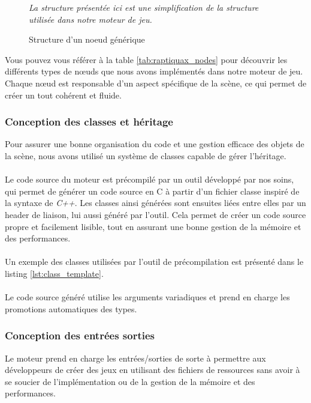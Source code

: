     \begin{figure}[h]
        \centering
        
        \emph{La structure présentée ici est une simplification de la structure utilisée dans notre moteur de jeu.}
        \caption{Structure d'un noeud générique}
        \label{fig:node_structure}
    \end{figure}

    Vous pouvez vous référer à la table \ref{tab:raptiquax_nodes} pour découvrir
    les différents types de n\oe{}uds que nous avons implémentés dans notre
    moteur de jeu. Chaque n\oe{}ud est responsable d'un aspect spécifique de
    la scène, ce qui permet de créer un tout cohérent et fluide.


\subsubsection{Conception des classes et héritage}

    Pour assurer une bonne organisation du code et une gestion efficace
    des objets de la scène, nous avons utilisé un système de classes capable
    de gérer l'héritage.
    \\ \\
    Le code source du moteur est précompilé par un outil développé par nos
    soins, qui permet de générer un code source en C à partir d'un fichier
    classe inspiré de la syntaxe de \emph{C++}. Les classes ainsi générées
    sont ensuites liées entre elles par un header de liaison, lui aussi
    généré par l'outil. Cela permet de créer un code source propre et
    facilement lisible, tout en assurant une bonne gestion de la mémoire et des
    performances.
    \\ \\
    Un exemple des classes utilisées par l'outil de précompilation est
    présenté dans le listing \ref{lst:class_template}.
    \\ \\
    Le code source généré utilise les arguments variadiques et prend en charge
    les promotions automatiques des types.
\subsubsection{Conception des entrées sorties}

    Le moteur prend en charge les entrées/sorties de sorte à permettre
    aux développeurs de créer des jeux en utilisant des fichiers de
    ressources sans avoir à se soucier de l'implémentation ou de la gestion
    de la mémoire et des performances.
